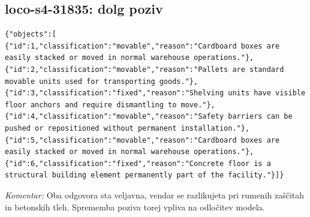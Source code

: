 \documentclass[11pt,a4paper]{article}
\begin{document}
\subsection{loco-s4-31835: dolg poziv}
\begin{lstlisting}
{"objects":[
{"id":1,"classification":"movable","reason":"Cardboard boxes are easily stacked or moved in normal warehouse operations."},
{"id":2,"classification":"movable","reason":"Pallets are standard movable units used for transporting goods."},
{"id":3,"classification":"fixed","reason":"Shelving units have visible floor anchors and require dismantling to move."},
{"id":4,"classification":"movable","reason":"Safety barriers can be pushed or repositioned without permanent installation."},
{"id":5,"classification":"movable","reason":"Cardboard boxes are easily stacked or moved in normal warehouse operations."},
{"id":6,"classification":"fixed","reason":"Concrete floor is a structural building element permanently part of the facility."}]}
\end{lstlisting}
\textit{Komentar:} Oba odgovora sta veljavna, vendar se razlikujeta pri rumenih zaščitah in betonskih tleh. Sprememba poziva torej vpliva na odločitev modela.
\end{document}
